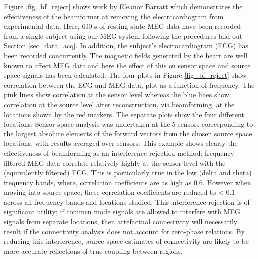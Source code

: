 Figure \ref{fig_bf_reject} shows work by Eleanor Barratt \citep{ONeill2015b} which demonstrates the effectiveness of the beamformer at removing the electrocardiogram from experimental data. Here, 600 s of resting state MEG data have been recorded from a single subject using our MEG system following the procedures laid out Section \ref{sec_data_acq}. In addition, the subject’s electrocardiogram (ECG) has been recorded concurrently. The magnetic fields generated by the heart are well known to affect MEG data and here the effect of this on sensor space and source space signals has been calculated. The four plots in Figure \ref{fig_bf_reject} show correlation between the ECG and MEG data, plot as a function of frequency. The pink lines show correlation at the sensor level whereas the blue lines show correlation at the source level after reconstruction, via beamforming, at the locations shown by the red markers. The separate plots show the four different locations. Sensor space analysis was undertaken at the 5 sensors corresponding to the largest absolute elements of the forward vectors from the chosen source space locations, with results averaged over sensors. This example shows clearly the effectiveness of beamforming as an interference rejection method: frequency filtered MEG data correlate relatively highly at the sensor level with the (equivalently filtered) ECG. This is particularly true in the low (delta and theta) frequency bands, where, correlation coefficients are as high as 0.6. However when moving into source space, these correlation coefficients are reduced to < 0.1 across all frequency bands and locations studied. This interference rejection is of significant utility; if common mode signals are allowed to interfere with MEG signals from separate locations, then artefactual connectivity will necessarily result if the connectivity analysis does not account for zero-phase relations. By reducing this interference, source space estimates of connectivity are likely to be more accurate reflections of true coupling between regions. 

